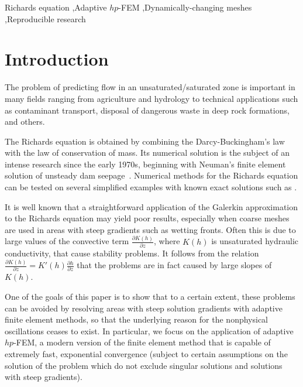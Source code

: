 \documentclass[final,3p,times,twocolumn]{elsarticle}
\begin{document}
\begin{frontmatter}
\begin{keyword}
Richards equation \sep Adaptive $hp$-FEM \sep Dynamically-changing meshes \sep Reproducible research


\end{keyword}

\end{frontmatter}



\section{Introduction}
\label{sec:intro}

The problem of predicting flow in an unsaturated/saturated zone is 
important in many fields ranging from agriculture and hydrology to technical 
applications such as contaminant transport, disposal of dangerous waste in deep 
rock formations, and others.

The Richards equation is obtained by combining the Darcy-Buckingham's law
with the law of conservation of mass. Its numerical solution 
is the subject of an intense research since the early 1970s, beginning with Neuman's 
finite element solution of unsteady dam seepage~\cite{neuman1}. 
Numerical methods for the Richards equation
can be tested on several simplified examples with known exact solutions 
such as \cite{tracy1,tracy2}. 

It is well known that a straightforward application of the Galerkin approximation
to the Richards equation may yield poor results, especially when coarse meshes are 
used in areas with steep gradients such as wetting fronts.
Often this is due to large values of the convective term 
$\frac{\partial K(h)}{\partial z}$, where $K(h)$ is unsaturated hydraulic 
conductivity, that cause stability problems.
It follows from the relation  $\frac{\partial K(h)}{\partial z}=K'(h)\frac{\partial h}{\partial z}$
that the problems are in fact caused by large slopes of $K(h)$. 

One of the goals of this paper is to show that to a certain extent, these problems 
can be avoided by resolving areas with steep solution gradients with adaptive 
finite element methods, so that 
the underlying reason for the nonphysical oscillations ceases to exist. In particular,
we focus on the application of adaptive $hp$-FEM, a modern version of the finite element 
method that is capable of extremely fast, exponential convergence \cite{babuska1}
(subject to certain assumptions on the solution of the problem which do not exclude
singular solutions and solutions with steep gradients).
\end{document}
